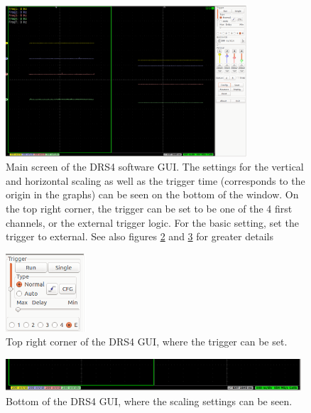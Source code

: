 \documentclass[12pt]{article}
\begin{document}
\begin{figure}[H]
    \centering
    \includegraphics[width = 9cm]{pics/DRS_oscilloscope_settings.png}
    \caption{\small Main screen of the DRS4 software GUI. The settings for the vertical and horizontal scaling as well as the trigger time (corresponds to the origin in the graphs) can be seen on the bottom of the window. On the top right corner, the trigger can be set to be one of the 4 first channels, or the external trigger logic. For the basic setting, set the trigger to external. See also figures \ref{fig:DRS_oscilloscope_settings_details_top_right} and \ref{fig:DRS_oscilloscope_settings_details_scaling} for greater details}
    \label{fig:DRS_oscilloscope_settings}
\end{figure}
\begin{figure}[H]
    \centering
    \includegraphics[width = 3cm]{pics/DRS_oscilloscope_settings_details_top_right.png}
    \caption{\small Top right corner of the DRS4 GUI, where the trigger can be set.}
    \label{fig:DRS_oscilloscope_settings_details_top_right}
\end{figure}
\begin{figure}[H]
    \centering
    \includegraphics[width = 11cm]{pics/DRS_oscilloscope_settings_details_scaling.png}
    \caption{\small Bottom of the DRS4 GUI, where the scaling settings can be seen.}
    \label{fig:DRS_oscilloscope_settings_details_scaling}
\end{figure}
\end{document}
